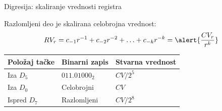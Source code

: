 \begin{frame}[label=04-s027]{Digresija: skaliranje vrednosti registra}
\par
{\fontsize{10}{12}\selectfont\renewcommand{\arraystretch}{.95}\par}\par\vspace{2mm}
Razlomljeni deo je skalirana celobrojna vrednost:
\[RV_r=c_{-1}r^{-1}+c_{-2}r^{-2}+\ldots+c_{-k}r^{-k}=\alert{\frac{CV_r}{r^k}}\]
{\fontsize{10}{12}\selectfont\begin{tabularx}{\linewidth}{@{}lXX@{}}\toprule
Položaj tačke & Binarni zapis & Stvarna vrednost\\\midrule
Iza $D_5$ & $011.01000_2$ & $CV/2^5$\\[1mm]
Iza $D_0$ & Celobrojni & $CV$\\[1mm]
Ispred $D_7$ & Razlomljeni & $CV/2^8$\\\bottomrule
\end{tabularx}\par}
\end{frame}
